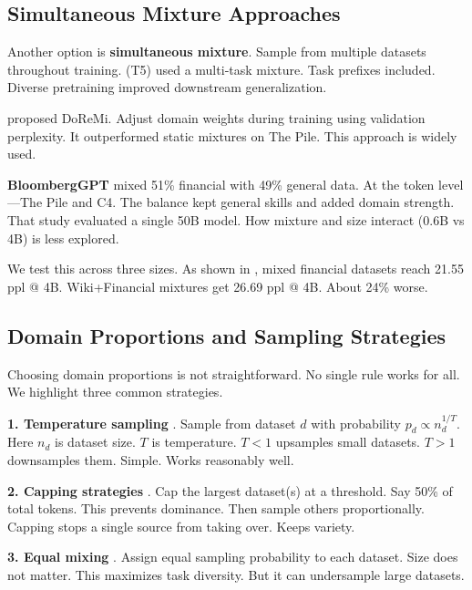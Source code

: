 \subsection{Simultaneous Mixture Approaches}

Another option is \textbf{simultaneous mixture}. Sample from multiple datasets throughout training. \textcite{raffel2020exploring} (T5) used a multi‑task mixture. Task prefixes included. Diverse pretraining improved downstream generalization.

\textcite{xie2023doremi} proposed DoReMi. Adjust domain weights during training using validation perplexity. It outperformed static mixtures on The Pile. This approach is widely used.

\textbf{BloombergGPT} \parencite{wu2023bloomberggpt} mixed 51\% financial with 49\% general data. At the token level—The Pile and C4. The balance kept general skills and added domain strength. That study evaluated a single 50B model. How mixture and size interact (0.6B vs 4B) is less explored.

We test this across three sizes. As shown in , mixed financial datasets reach 21.55 ppl @ 4B. Wiki+Financial mixtures get 26.69 ppl @ 4B. About 24\% worse.

\subsection{Domain Proportions and Sampling Strategies}

Choosing domain proportions is not straightforward. No single rule works for all. We highlight three common strategies.

\textbf{1. Temperature sampling} \parencite{arivazhagan2019massively}. Sample from dataset $d$ with probability $p_d \propto n_d^{1/T}$. Here $n_d$ is dataset size. $T$ is temperature. $T < 1$ upsamples small datasets. $T > 1$ downsamples them. Simple. Works reasonably well.

\textbf{2. Capping strategies} \parencite{longpre2023pretrainer}. Cap the largest dataset(s) at a threshold. Say 50\% of total tokens. This prevents dominance. Then sample others proportionally. Capping stops a single source from taking over. Keeps variety.

\textbf{3. Equal mixing} \parencite{sanh2022multitask}. Assign equal sampling probability to each dataset. Size does not matter. This maximizes task diversity. But it can undersample large datasets.

